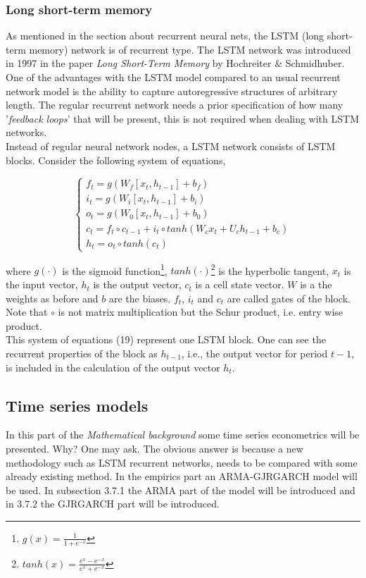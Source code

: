 \documentclass[12pt, letterpaper]{amsart}%
\begin{document}
\subsubsection{Long short-term memory}
As mentioned in the section about recurrent neural nets, the LSTM (long short-term memory) network is of recurrent type. The LSTM network was introduced in 1997 in the paper \textit{Long Short-Term Memory} by Hochreiter \& Schmidhuber. One of the advantages with the LSTM model compared to an usual recurrent network model is the ability to capture autoregressive structures of arbitrary length. The regular recurrent network needs a prior specification of how many '\textit{feedback loops}' that will be present, this is not required when dealing with LSTM networks.
\\

Instead of regular neural network nodes, a LSTM network consists of LSTM blocks. Consider the following system of equations,

\begin{equation}
\begin{cases}
f_t = g \left( W_f [x_t, h_{t-1}] + b_f \right)\\
i_t = g \left( W_i [x_t, h_{t-1}] + b_i \right)\\
o_t = g \left( W_0 [x_t, h_{t-1}] + b_0 \right)\\
c_t = f_t \circ c_{t-1} + i_t \circ tanh \left( W_c x_t + U_c h_{t-1} + b_c \right)\\
h_t = o_t \circ tanh \left( c_t \right)
\end{cases}
\end{equation}

where $g(\cdot)$ is the sigmoid function\footnote{$g(x)=\frac{1}{1+e^{-x}}$}, $tanh(\cdot)$\footnote{$tanh(x)= \frac{e^x - e^{-x}}{e^x + e^{-x}}$} is the hyperbolic tangent, $x_t$ is the input vector, $h_t$ is the output vector, $c_t$ is a cell state vector. $W$ is a the weights as before and $b$ are the biases. $f_t$, $i_t$ and $c_t$ are called gates of the block. Note that $\circ$ is not matrix multiplication but the Schur product, i.e. entry wise product.
\\

This system of equations (19) represent one LSTM block. One can see the recurrent properties of the block as $h_{t-1}$, i.e., the output vector for period $t-1$, is included in the calculation of the output vector $h_t$.

\subsection{Time series models}
In this part of the \textit{Mathematical background} some time series econometrics will be presented. Why? One may ask. The obvious answer is because a new methodology such as LSTM recurrent networks, needs to be compared with some already existing method. In the empirics part an ARMA-GJRGARCH model will be used. In subsection 3.7.1 the ARMA part of the model will be introduced and in 3.7.2 the GJRGARCH part will be introduced.
\end{document}
